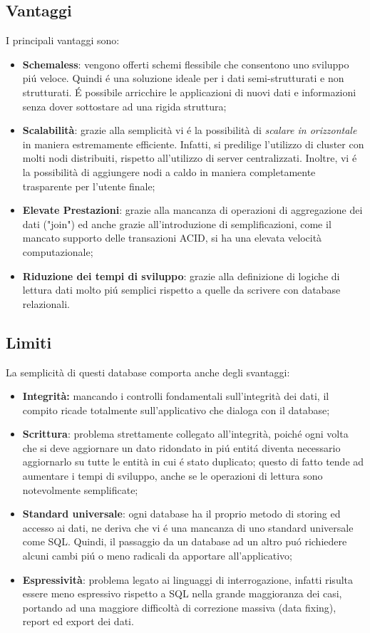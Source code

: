 \subsection{Vantaggi}
I principali vantaggi sono:
\begin{itemize}
    \item \textbf{Schemaless}: vengono offerti schemi flessibile che consentono uno sviluppo piú veloce. Quindi é una soluzione ideale
    per i dati semi-strutturati e non strutturati. É possibile arricchire le applicazioni di nuovi dati e informazioni
    senza dover sottostare ad una rigida struttura;
    \item \textbf{Scalabilità}: grazie alla semplicità vi é la possibilità di \emph{scalare in orizzontale} in maniera estremamente
    efficiente. Infatti, si predilige l'utilizzo di cluster con molti nodi distribuiti, rispetto all'utilizzo di server centralizzati.
    Inoltre, vi é la possibilità di aggiungere nodi a caldo in maniera completamente trasparente per l'utente finale;
    \item \textbf{Elevate Prestazioni}: grazie alla mancanza di operazioni di aggregazione dei dati ("join") ed anche grazie
    all'introduzione di semplificazioni, come il mancato supporto delle transazioni ACID, si ha una elevata velocità computazionale;
    \item \textbf{Riduzione dei tempi di sviluppo}: grazie alla definizione di logiche di lettura dati molto piú semplici rispetto a quelle da scrivere con
    database relazionali.
\end{itemize}

\subsection{Limiti}
La semplicità di questi database comporta anche degli svantaggi:
\begin{itemize}
    \item \textbf{Integrità:} mancando i controlli fondamentali sull'integrità dei dati, il compito ricade totalmente sull'applicativo che dialoga con il database;
    \item \textbf{Scrittura}: problema strettamente collegato all'integrità, poiché ogni volta che si deve aggiornare un dato ridondato in piú entitá diventa
    necessario aggiornarlo su tutte le entità in cui é stato duplicato; questo di fatto tende ad aumentare i tempi di sviluppo, anche se le operazioni
    di lettura sono notevolmente semplificate;
    \item \textbf{Standard universale}: ogni database ha il proprio metodo di storing ed accesso ai dati, ne deriva che vi é una mancanza di uno standard
    universale come SQL. Quindi, il passaggio da un database ad un altro puó richiedere alcuni cambi piú o meno radicali da apportare all'applicativo;
    \item \textbf{Espressività}: problema legato ai linguaggi di interrogazione, infatti risulta essere meno espressivo rispetto a SQL nella grande maggioranza dei
    casi, portando ad una maggiore difficoltà di correzione massiva (data fixing), report ed export dei dati.

\end{itemize}


